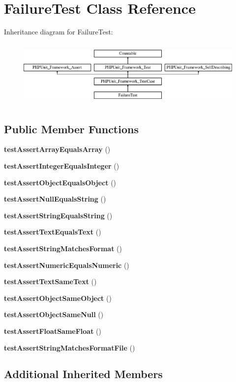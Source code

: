 \section{Failure\+Test Class Reference}
\label{class_failure_test}
Inheritance diagram for Failure\+Test\+:\begin{figure}[H]
\begin{center}
\leavevmode
\includegraphics[height=3.303835cm]{class_failure_test}
\end{center}
\end{figure}
\subsection*{Public Member Functions}
\begin{DoxyCompactItemize}
\item 
{\bf test\+Assert\+Array\+Equals\+Array} ()
\item 
{\bf test\+Assert\+Integer\+Equals\+Integer} ()
\item 
{\bf test\+Assert\+Object\+Equals\+Object} ()
\item 
{\bf test\+Assert\+Null\+Equals\+String} ()
\item 
{\bf test\+Assert\+String\+Equals\+String} ()
\item 
{\bf test\+Assert\+Text\+Equals\+Text} ()
\item 
{\bf test\+Assert\+String\+Matches\+Format} ()
\item 
{\bf test\+Assert\+Numeric\+Equals\+Numeric} ()
\item 
{\bf test\+Assert\+Text\+Same\+Text} ()
\item 
{\bf test\+Assert\+Object\+Same\+Object} ()
\item 
{\bf test\+Assert\+Object\+Same\+Null} ()
\item 
{\bf test\+Assert\+Float\+Same\+Float} ()
\item 
{\bf test\+Assert\+String\+Matches\+Format\+File} ()
\end{DoxyCompactItemize}
\subsection*{Additional Inherited Members}


